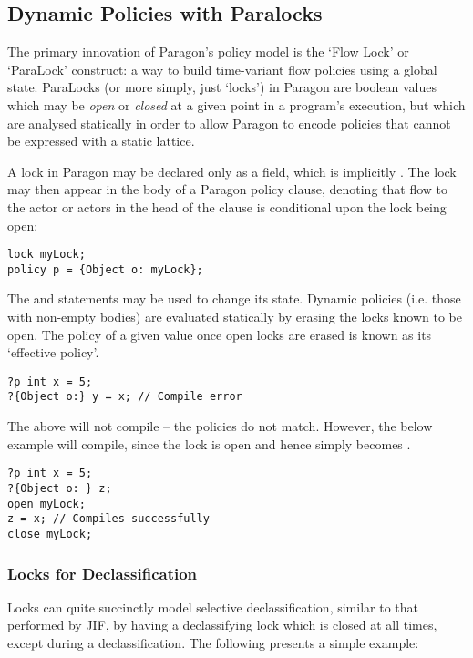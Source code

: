 \subsection{Dynamic Policies with Paralocks}

The primary innovation of Paragon's policy model is the `Flow Lock' or `ParaLock' construct: a way to build time-variant flow policies using a global state. ParaLocks (or more simply, just `locks') in Paragon are boolean values which may be \textit{open} or \textit{closed} at a given point in a program's execution, but which are analysed statically in order to allow Paragon to encode policies that cannot be expressed with a static lattice.

A lock in Paragon may be declared only as a field, which is implicitly . The lock may then appear in the body of a Paragon policy clause, denoting that flow to the actor or actors in the head of the clause is conditional upon the lock being open:

\begin{verbatim}
lock myLock;
policy p = {Object o: myLock};
\end{verbatim}

The  and  statements may be used to change its state. Dynamic policies (i.e. those with non-empty bodies) are evaluated statically by erasing the locks known to be open. The policy of a given value once open locks are erased is known as its `effective policy'.

\begin{verbatim}
?p int x = 5;
?{Object o:} y = x; // Compile error
\end{verbatim}

The above will not compile -- the policies do not match. However, the below example will compile, since the lock is open and hence  simply becomes .

\begin{verbatim}
?p int x = 5;
?{Object o: } z;
open myLock;
z = x; // Compiles successfully
close myLock;
\end{verbatim}

\subsubsection{Locks for Declassification}

Locks can quite succinctly model selective declassification, similar to that performed by JIF, by having a declassifying lock which is closed at all times, except during a declassification. The following presents a simple example:

